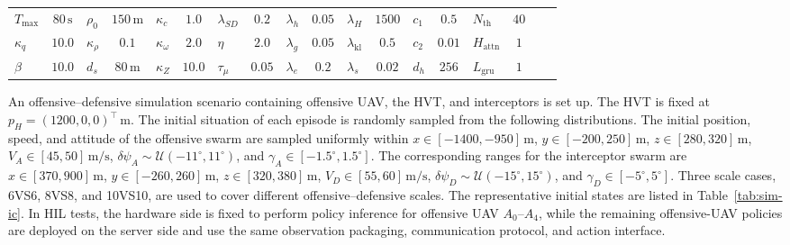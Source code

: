 \documentclass{cja}
\begin{document}
\begin{table}[!t]
{\begin{tabular}{@{}lc|lc|lc|lc|lc|lc|lc|lc|lc@{}}
$T_{\max}$ & $80\,\mathrm{s}$ & $\rho_0$ & $150\,\mathrm{m}$ & $\kappa_c$ & $1.0$ & $\lambda_{SD}$ & $0.2$ & $\lambda_h$ & $0.05$ & $\lambda_H$ & $1500$ & $c_1$ & $0.5$ & $N_{\mathrm{th}}$ & $40$ & & \\
$\kappa_q$ & $10.0$ & $\kappa_{\rho}$ & $0.1$ & $\kappa_{\omega}$ & $2.0$ & $\eta$ & $2.0$ & $\lambda_g$ & $0.05$ & $\lambda_{\mathrm{kl}}$ & $0.5$ & $c_2$ & $0.01$ & $H_{\mathrm{attn}}$ & $1$ & & \\
$\beta$ & $10.0$ & $d_s$ & $80\,\mathrm{m}$ & $\kappa_Z$ & $10.0$ & $\tau_{\mu}$ & $0.05$ & $\lambda_e$ & $0.2$ & $\lambda_s$ & $0.02$ & $d_h$ & $256$ & $L_{\mathrm{gru}}$ & $1$ & & \\
\bottomrule
\end{tabular}%
}
\end{table}

An offensive--defensive simulation scenario containing offensive UAV, the HVT, and interceptors is set up. The HVT is fixed at $p_H=(1200,0,0)^\top\,\mathrm{m}$.
The initial situation of each episode is randomly sampled from the following distributions. The initial position, speed, and attitude of the offensive swarm are sampled uniformly within $x\in[-1400,-950]\,\mathrm{m}$, $y\in[-200,250]\,\mathrm{m}$, $z\in[280,320]\,\mathrm{m}$, $V_A\in[45,50]\,\mathrm{m/s}$, $\delta\psi_A\sim\mathcal{U}(-11^\circ,11^\circ)$, and $\gamma_A\in[-1.5^\circ,1.5^\circ]$. The corresponding ranges for the interceptor swarm are $x\in[370,900]\,\mathrm{m}$, $y\in[-260,260]\,\mathrm{m}$, $z\in[320,380]\,\mathrm{m}$, $V_D\in[55,60]\,\mathrm{m/s}$, $\delta\psi_D\sim\mathcal{U}(-15^\circ,15^\circ)$, and $\gamma_D\in[-5^\circ,5^\circ]$.
Three scale cases, 6VS6, 8VS8, and 10VS10, are used to cover different offensive--defensive scales. The representative initial states are listed in Table~\ref{tab:sim-ic}.
In HIL tests, the hardware side is fixed to perform policy inference for offensive UAV $A_0$--$A_4$, while the remaining offensive-UAV policies are deployed on the server side and use the same observation packaging, communication protocol, and action interface.
\end{document}
